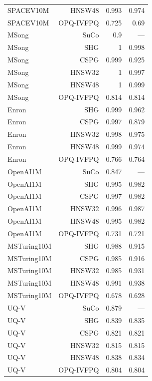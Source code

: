 \begin{table}[t]
\begin{tabular}{lrrr}
SPACEV10M & HNSW48 & 0.993 & 0.974 \\
SPACEV10M & OPQ-IVFPQ & 0.725 & 0.69 \\
MSong & SuCo & 0.9 & — \\
MSong & SHG & 1 & 0.998 \\
MSong & CSPG & 0.999 & 0.925 \\
MSong & HNSW32 & 1 & 0.997 \\
MSong & HNSW48 & 1 & 0.999 \\
MSong & OPQ-IVFPQ & 0.814 & 0.814 \\
Enron & SHG & 0.999 & 0.962 \\
Enron & CSPG & 0.997 & 0.879 \\
Enron & HNSW32 & 0.998 & 0.975 \\
Enron & HNSW48 & 0.999 & 0.974 \\
Enron & OPQ-IVFPQ & 0.766 & 0.764 \\
OpenAI1M & SuCo & 0.847 & — \\
OpenAI1M & SHG & 0.995 & 0.982 \\
OpenAI1M & CSPG & 0.997 & 0.982 \\
OpenAI1M & HNSW32 & 0.996 & 0.987 \\
OpenAI1M & HNSW48 & 0.995 & 0.982 \\
OpenAI1M & OPQ-IVFPQ & 0.731 & 0.721 \\
MSTuring10M & SHG & 0.988 & 0.915 \\
MSTuring10M & CSPG & 0.985 & 0.916 \\
MSTuring10M & HNSW32 & 0.985 & 0.931 \\
MSTuring10M & HNSW48 & 0.991 & 0.938 \\
MSTuring10M & OPQ-IVFPQ & 0.678 & 0.628 \\
UQ-V & SuCo & 0.879 & — \\
UQ-V & SHG & 0.839 & 0.835 \\
UQ-V & CSPG & 0.821 & 0.821 \\
UQ-V & HNSW32 & 0.815 & 0.815 \\
UQ-V & HNSW48 & 0.838 & 0.834 \\
UQ-V & OPQ-IVFPQ & 0.804 & 0.804 \\
\bottomrule
\end{tabular}
\end{table}
